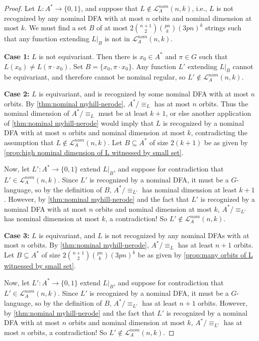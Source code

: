 \documentclass[11pt,a4paper]{amsart}
\theoremstyle{definition}
\newcommand{\mc}{\mathcal}
\begin{document}
\begin{proof}
    Let $L : A^* \to \{0,1\}$, and suppose that $L \notin \mc L^{nom}_A(n,k)$, i.e., $L$ is not recognized by any nominal DFA with at most $n$ orbits and nominal dimension at most $k$.
    We must find a set $B$ of at most $2 \binom{n+1}{2} \binom{pn}{k} (3pn)^k$ strings such that any function extending $L|_B$ is not in $\mc L^{nom}_A(n,k)$.

    \textbf{Case 1:} $L$ is not equivariant.
    Then there is $x_0 \in A^*$ and $\pi \in G$ such that $L(x_0) \neq L(\pi \cdot x_0)$.
    Set $B = \{x_0, \pi \cdot x_0\}$.
    Any function $L'$ extending $L|_B$ cannot be equivariant, and therefore cannot be nominal regular, so $L' \notin \mc L^{nom}_A(n,k)$. 

    \textbf{Case 2:} $L$ is equivariant, and is recognized by some nominal DFA with at most $n$ orbits. 
    By \autoref{thm:nominal myhill-nerode}, $A^* / \equiv_L$ has at most $n$ orbits. 
    Thus the nominal dimension of $A^* / \equiv_L$ must be at least $k+1$, or else another application of \autoref{thm:nominal myhill-nerode} would imply that $L$ is recognized by a nominal DFA with at most $n$ orbits and nominal dimension at most $k$, contradicting the assumption that $L \notin \mc L^{nom}_A(n,k)$. 
    Let $B \subseteq A^*$ of size $2(k+1)$ be as given by \autoref{prop:high nominal dimension of L witnessed by small set}.
    
    Now, let $L' : A^* \to \{0,1\}$ extend $L|_B$, and suppose for contradiction that $L' \in \mc L^{nom}_A(n,k)$. 
    Since $L'$ is recognized by a nominal DFA, it must be a $G$-language, so by the definition of $B$, $A^* / \equiv_{L'}$ has nominal dimension at least $k+1$.
    However, by \autoref{thm:nominal myhill-nerode} and the fact that $L'$ is recognized by a nominal DFA with at most $n$ orbits and nominal dimension at most $k$, $A^* / \equiv_{L'}$ has nominal dimension at most $k$, a contradiction!
    So $L' \notin \mc L^{nom}_A(n,k)$.

    \textbf{Case 3:} $L$ is equivariant, and $L$ is not recognized by any nominal DFAs with at most $n$ orbits.
    By \autoref{thm:nominal myhill-nerode}, $A^* / \equiv_L$ has at least $n+1$ orbits.
    Let $B \subseteq A^*$ of size $2 \binom{n+1}{2} \binom{pn}{k} (3pn)^k$ be as given by \autoref{prop:many orbits of L witnessed by small set}.

    Now, let $L' : A^* \to \{0,1\}$ extend $L|_B$, and suppose for contradiction that $L' \in \mc L^{nom}_A(n,k)$. 
    Since $L'$ is recognized by a nominal DFA, it must be a $G$-language, so by the definition of $B$, $A^* / \equiv_{L'}$ has at least $n+1$ orbits.
    However, by \autoref{thm:nominal myhill-nerode} and the fact that $L'$ is recognized by a nominal DFA with at most $n$ orbits and nominal dimension at most $k$, $A^* / \equiv_{L'}$ has at most $n$ orbits, a contradiction!
    So $L' \notin \mc L^{nom}_A(n,k)$.
    

\end{proof}
\end{document}
